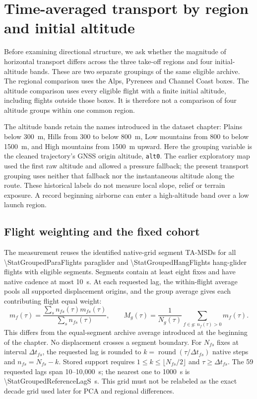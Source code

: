 \section{Time-averaged transport by region and initial altitude}
\label{sec:grouped-tamsd}

Before examining directional structure, we ask whether the magnitude of horizontal
transport differs across the three take-off regions and four initial-altitude bands.
These are two separate groupings of the same eligible archive. The regional comparison
uses the Alps, Pyrenees and Channel Coast boxes. The altitude comparison uses every
eligible flight with a finite initial altitude, including flights outside those boxes.
It is therefore not a comparison of four altitude groups within one common region.

The altitude bands retain the names introduced in the dataset chapter:
Plains below \SI{300}{\metre}, Hills from 300 to below \SI{800}{\metre},
Low mountains from 800 to below \SI{1500}{\metre}, and High mountains from
\SI{1500}{\metre} upward. Here the grouping variable is the cleaned trajectory's
GNSS origin altitude, \texttt{alt0}. The earlier exploratory map used the first raw
altitude and allowed a pressure fallback; the present transport grouping uses neither
that fallback nor the instantaneous altitude along the route. These historical labels
do not measure local slope, relief or terrain exposure. A record beginning airborne
can enter a high-altitude band over a low launch region.

\subsection{Flight weighting and the fixed cohort}

The measurement reuses the identified native-grid segment TA-MSDs for all
\num{\StatGroupedParaFlights} paraglider and \num{\StatGroupedHangFlights}
hang-glider flights with eligible segments. Segments contain at least eight fixes
and have native cadence at most \SI{10}{\second}. At each requested lag, the
within-flight average pools all supported displacement origins, and the group
average gives each contributing flight equal weight:
\begin{equation}
 m_f(\tau)=\frac{\sum_s n_{fs}(\tau)m_{fs}(\tau)}{\sum_s n_{fs}(\tau)},\qquad
 M_g(\tau)=\frac{1}{N_g(\tau)}\sum_{f\in g:\,n_f(\tau)>0}m_f(\tau).
 \label{eq:grouped-flight-tamsd}
\end{equation}
This differs from the equal-segment archive average introduced at the beginning
of the chapter. No displacement crosses a segment boundary. For $N_{fs}$ fixes
at interval $\Delta t_{fs}$, the requested lag is rounded to
$k=\operatorname{round}(\tau/\Delta t_{fs})$ native steps and
$n_{fs}=N_{fs}-k$. Stored support requires $1\le k\le\lfloor N_{fs}/2\rfloor$
and $\tau\ge\Delta t_{fs}$. The 59 requested lags span 10--10,000~s; the nearest
one to 1000~s is \SI{\StatGroupedReferenceLagS}{\second}. This grid must not be
relabeled as the exact decade grid used later for PCA and regional differences.

